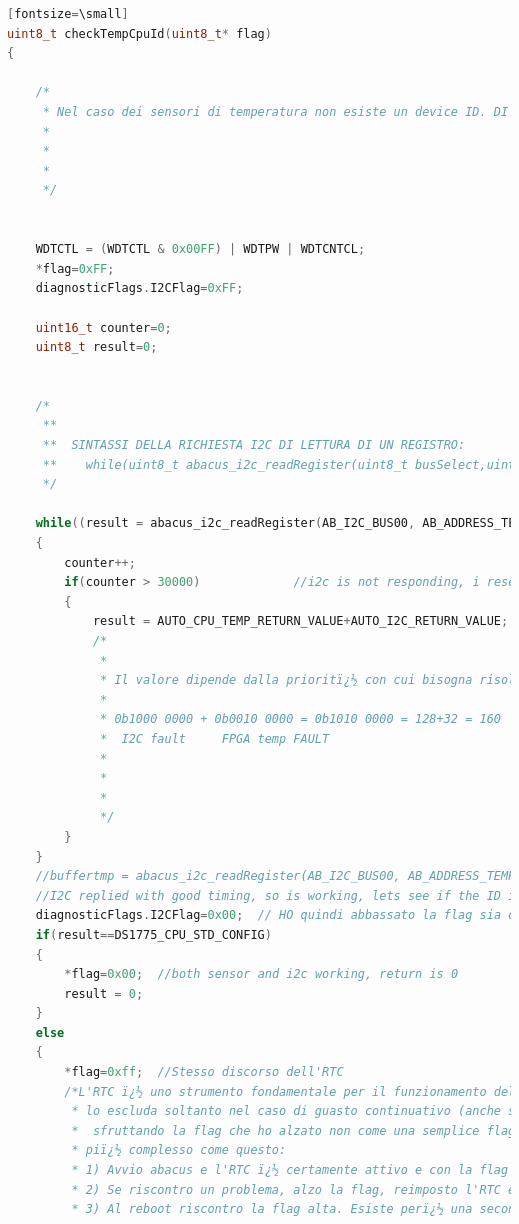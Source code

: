 \documentclass[LaM,binding=0.6cm]{../sapthesis}
\begin{document}
\begin{lstlisting}[language=c][fontsize=\small]
uint8_t checkTempCpuId(uint8_t* flag)
{

    /*
     * Nel caso dei sensori di temperatura non esiste un device ID. DI conseguenza possiamo controllare soltanto il registro di impostazione
     *
     *
     *
     */


    WDTCTL = (WDTCTL & 0x00FF) | WDTPW | WDTCNTCL;
    *flag=0xFF;
    diagnosticFlags.I2CFlag=0xFF;

    uint16_t counter=0;
    uint8_t result=0;


    /*
     **
     **  SINTASSI DELLA RICHIESTA I2C DI LETTURA DI UN REGISTRO:
     **    while(uint8_t abacus_i2c_readRegister(uint8_t busSelect,uint8_t address, uint8_t reg)
     */

    while((result = abacus_i2c_readRegister(AB_I2C_BUS00, AB_ADDRESS_TEMPFPGA, DS1775CONFIGREG))==0x00)
    {
        counter++;
        if(counter > 30000)             //i2c is not responding, i reset, so i set both acc and i2c not working to be sure
        {
            result = AUTO_CPU_TEMP_RETURN_VALUE+AUTO_I2C_RETURN_VALUE;
            /*
             *
             * Il valore dipende dalla prioritï¿½ con cui bisogna risolvere il problema: questo identifica che sia il bus IC che l'accelerometro sono non funzionanti:
             *
             * 0b1000 0000 + 0b0010 0000 = 0b1010 0000 = 128+32 = 160
             *  I2C fault     FPGA temp FAULT
             *
             *
             *
             */
        }
    }
    //buffertmp = abacus_i2c_readRegister(AB_I2C_BUS00, AB_ADDRESS_TEMPCPU, DS1775CONFIGREG);
    //I2C replied with good timing, so is working, lets see if the ID is correct
    diagnosticFlags.I2CFlag=0x00;  // HO quindi abbassato la flag sia del sensore che del bus
    if(result==DS1775_CPU_STD_CONFIG)
    {
        *flag=0x00;  //both sensor and i2c working, return is 0
        result = 0;
    }
    else
    {
        *flag=0xff;  //Stesso discorso dell'RTC
        /*L'RTC ï¿½ uno strumento fondamentale per il funzionamento del sistema. Bisogna creare un sistema che
         * lo escluda soltanto nel caso di guasto continuativo (anche se lo resetto). Questo potrebbe essere fatto
         *  sfruttando la flag che ho alzato non come una semplice flag che esclude direttamente al reset, ma con un sistema
         * piï¿½ complesso come questo:
         * 1) Avvio abacus e l'RTC ï¿½ certamente attivo e con la flag abbassata (a 0x0 )
         * 2) Se riscontro un problema, alzo la flag, reimposto l'RTC e rebootto.
         * 3) Al reboot riscontro la flag alta. Esiste perï¿½ una seconda flag che tiene conto se il problema ï¿½ perdurato e questa ï¿½ ancora bassa.

\end{lstlisting}
\end{document}
